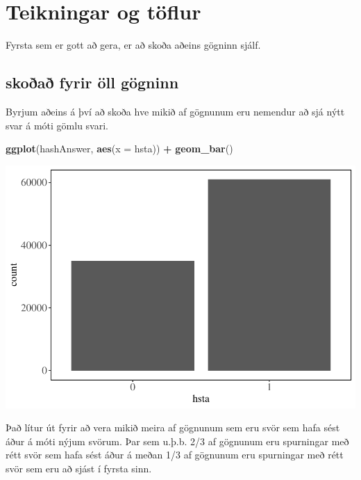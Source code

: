 \documentclass[
]{article}
\newenvironment{Shaded}{\begin{snugshade}}{\end{snugshade}}
\newcommand{\DataTypeTok}[1]{\textcolor[rgb]{0.13,0.29,0.53}{#1}}
\newcommand{\KeywordTok}[1]{\textcolor[rgb]{0.13,0.29,0.53}{\textbf{#1}}}
\newcommand{\NormalTok}[1]{#1}
\newcommand{\OperatorTok}[1]{\textcolor[rgb]{0.81,0.36,0.00}{\textbf{#1}}}
\newcommand{\StringTok}[1]{\textcolor[rgb]{0.31,0.60,0.02}{#1}}
\begin{document}
\hypertarget{teikningar-og-tuxf6flur}{%
\section{Teikningar og töflur}\label{teikningar-og-tuxf6flur}}

Fyrsta sem er gott að gera, er að skoða aðeins gögninn sjálf.

\hypertarget{skouxf0auxf0-fyrir-uxf6ll-guxf6gninn}{%
\subsection{skoðað fyrir öll gögninn}\label{skouxf0auxf0-fyrir-uxf6ll-guxf6gninn}}

Byrjum aðeins á því að skoða hve mikið af gögnunum eru nemendur að sjá nýtt svar á móti gömlu svari.

\begin{Shaded}
\begin{Highlighting}[]
\KeywordTok{ggplot}\NormalTok{(hashAnswer, }\KeywordTok{aes}\NormalTok{(}\DataTypeTok{x =}\NormalTok{ hsta)) }\OperatorTok{+}
\StringTok{  }\KeywordTok{geom_bar}\NormalTok{()}
\end{Highlighting}
\end{Shaded}

\includegraphics{Simplify_files/figure-latex/unnamed-chunk-1-1.pdf}

Það lítur út fyrir að vera mikið meira af gögnunum sem eru svör sem hafa sést áður á móti nýjum svörum.
Þar sem u.þ.b. 2/3 af gögnunum eru spurningar með rétt svör sem hafa sést áður á meðan 1/3 af gögnunum eru spurningar með rétt svör sem eru að sjást í fyrsta sinn.
\end{document}
